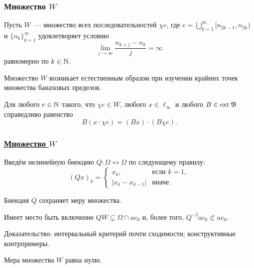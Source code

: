 \begin{frame}\frametitle{Множество $W$}


	Пусть $W$~--- множество всех последовательностей $\chi e$, где $e =\bigcup_{k=1}^{\infty} [n_{2k-1}, n_{2k} )$
	и $\{n_k \}_{k=1}^{\infty}$
	удовлетворяет условию
	\begin{equation}
		\label{eq:lim_j_n_kj_measure}
		\lim_{j\to\infty}\frac{n_{k+j} - n_k}{j} = \infty
	\end{equation}
	равномерно по $k \in \mathbb{N}$.

	\vfill

	Множество $W$ возникает естественным образом при изучении крайних точек множества банаховых пределов.

	\begin{llemma}
		Для любого $e\in\mathbb{N}$ такого, что $\chi e \in W$,
		любого $x\in\ell_\infty$
		и любого $B\in\operatorname{ext}\mathfrak{B}$
		справедливо равенство
		\begin{equation}
			B(x \cdot \chi e) = (Bx) \cdot (B\chi e)
			.
		\end{equation}
	\end{llemma}
\end{frame}




\begin{frame}\frametitle{\underline{Множество $W$}}
	Введём нелинейную биекцию $Q:\Omega\leftrightarrow\Omega$ по следующему правилу:
	\begin{equation}
		(Qx)_k = \begin{cases}
			x_k, &\mbox{если~} k = 1,
			\\
			|x_k-x_{k-1}|&\mbox{иначе}.
		\end{cases}
	\end{equation}

	\begin{llemma}
		Биекция $Q$ сохраняет меру множества.
	\end{llemma}

	\begin{llemma}
		Имеет место быть включение $QW\subsetneq \Omega\cap ac_0$ и,
		более того,
		$Q^{-2} ac_0 \not \subset ac_0$.
	\end{llemma}

	Доказательство: интервальный критерий почти сходимости;
	конструктивные контрпримеры.


	\begin{ttheorem}
		Мера множества $W$ равна нулю.
	\end{ttheorem}


\end{frame}





